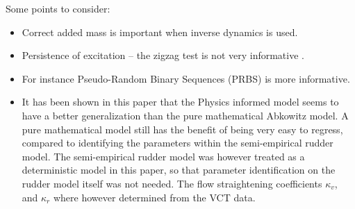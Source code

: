 Some points to consider:
\begin{itemize}
    \item Correct added mass is important when inverse dynamics is used.
    \item Persistence of excitation -- the zigzag test is not very informative \citep{sutulo_algorithm_2014}.
    \item For instance Pseudo-Random Binary Sequences (PRBS) \citep{landau_digital_2006} is more informative.
    \item It has been shown in this paper that the Physics informed model seems to have a better generalization than the pure mathematical Abkowitz model. A pure mathematical model still has the benefit of being very easy to regress, compared to
          identifying the parameters within the semi-empirical rudder model. The semi-empirical rudder model was however treated as a deterministic model in this paper, so that parameter identification on the rudder model itself was not needed. The flow straightening coefficients $\kappa_v$, and $\kappa_r$ where however determined from the VCT data.
\end{itemize}